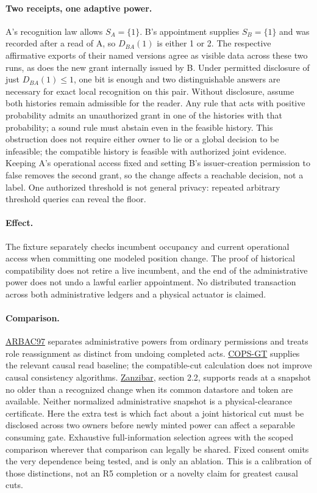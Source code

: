 \documentclass{article}
\begin{document}
\paragraph{Two receipts, one adaptive power.}
A's recognition law allows \(S_A=\{1\}\). B's appointment supplies \(S_B=\{1\}\) and was recorded after a read of A, so \(D_{BA}(1)\) is either 1 or 2. The respective affirmative exports of their named versions agree as visible data across these two runs, as does the new grant internally issued by B. Under permitted disclosure of just \(D_{BA}(1)\le 1\), one bit is enough and two distinguishable answers are necessary for exact local recognition on this pair. Without disclosure, assume both histories remain admissible for the reader. Any rule that acts with positive probability admits an unauthorized grant in one of the histories with that probability; a sound rule must abstain even in the feasible history. This obstruction does not require either owner to lie or a global decision to be infeasible; the compatible history is feasible with authorized joint evidence. Keeping A's operational access fixed and setting B's issuer-creation permission to false removes the second grant, so the change affects a reachable decision, not a label. One authorized threshold is not general privacy: repeated arbitrary threshold queries can reveal the floor.

\paragraph{Effect.}
The fixture separately checks incumbent occupancy and current operational access when committing one modeled position change. The proof of historical compatibility does not retire a live incumbent, and the end of the administrative power does not undo a lawful earlier appointment. No distributed transaction across both administrative ledgers and a physical actuator is claimed.

\paragraph{Comparison.}
\href{https://www.cs.purdue.edu/homes/ninghui/readings/AccessControl/sandhu_etal_99.pdf}{ARBAC97} separates administrative powers from ordinary permissions and treats role reassignment as distinct from undoing completed acts. \href{https://www.cs.princeton.edu/~mfreed/docs/cops-sosp11.pdf}{COPS-GT} supplies the relevant causal read baseline; the compatible-cut calculation does not improve causal consistency algorithms. \href{https://www.usenix.org/system/files/atc19-pang.pdf}{Zanzibar}, section 2.2, supports reads at a snapshot no older than a recognized change when its common datastore and token are available. Neither normalized administrative snapshot is a physical-clearance certificate. Here the extra test is which fact about a joint historical cut must be disclosed across two owners before newly minted power can affect a separable consuming gate. Exhaustive full-information selection agrees with the scoped comparison wherever that comparison can legally be shared. Fixed consent omits the very dependence being tested, and is only an ablation. This is a calibration of those distinctions, not an R5 completion or a novelty claim for greatest causal cuts.
\end{document}
